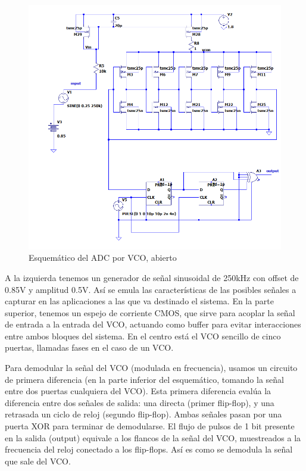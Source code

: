 \documentclass[12pt]{report} %
\begin{document}
	\begin{figure}[H]
		\includegraphics[width=\textwidth]{vco-open-first-diff-sch.png}
		\caption[Esquemático del ADC por VCO, abierto]{Esquemático del ADC por VCO, abierto}
		\label{fig:vco-open-first-diff-sch.png}
	\end{figure}
	
	A la izquierda tenemos un generador de señal sinusoidal de 250kHz con offset de 0.85V y amplitud 0.5V. Así se emula las características de las posibles señales a capturar en las aplicaciones a las que va destinado el sistema. En la parte superior, tenemos un espejo de corriente CMOS, que sirve para acoplar la señal de entrada a la entrada del VCO, actuando como buffer para evitar interacciones entre ambos bloques del sistema.
	En el centro está el VCO sencillo de cinco puertas, llamadas fases en el caso de un VCO. 
	
	
	Para demodular la señal del VCO (modulada en frecuencia), usamos un circuito de primera diferencia (en la parte inferior del esquemático, tomando la señal entre dos puertas cualquiera del VCO). Esta primera diferencia evalúa la diferencia entre dos señales de salida: una directa (primer flip-flop), y una retrasada un ciclo de reloj (segundo flip-flop). Ambas señales pasan por una puerta XOR para terminar de demodularse. El flujo de pulsos de 1 bit presente en la salida (output) equivale a los flancos de la señal del VCO, muestreados a la frecuencia del reloj conectado a los flip-flops. Así es como se demodula la señal que sale del VCO.
	
\end{document}
